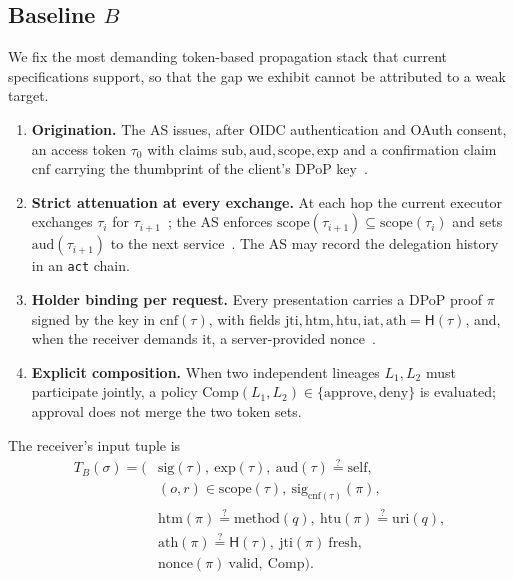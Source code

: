 \documentclass[conference]{IEEEtran}
\newcommand{\scope}{\mathrm{scope}}
\newcommand{\aud}{\mathrm{aud}}
\newcommand{\Comp}{\mathrm{Comp}}
\newcommand{\Hsh}{\mathsf{H}}
\begin{document}
\subsection{Baseline $B$}
We fix the most demanding token-based propagation stack that current specifications support, so that the gap we exhibit cannot be attributed to a weak target.

\begin{enumerate}
\item[\textbf{B1}] \textbf{Origination.} The AS issues, after OIDC authentication and OAuth consent, an access token $\tau_0$ with claims $\mathrm{sub},\aud,\scope,\mathrm{exp}$ and a confirmation claim $\mathrm{cnf}$ carrying the thumbprint of the client's DPoP key~\cite{rfc9449,rfc7519}.
\item[\textbf{B2}] \textbf{Strict attenuation at every exchange.} At each hop the current executor exchanges $\tau_i$ for $\tau_{i+1}$~\cite{rfc8693}; the AS enforces $\scope(\tau_{i+1})\subseteq\scope(\tau_i)$ and sets $\aud(\tau_{i+1})$ to the next service~\cite{rfc8707}. The AS may record the delegation history in an \texttt{act} chain.
\item[\textbf{B3}] \textbf{Holder binding per request.} Every presentation carries a DPoP proof $\pi$ signed by the key in $\mathrm{cnf}(\tau)$, with fields $\mathrm{jti},\mathrm{htm},\mathrm{htu},\mathrm{iat},\mathrm{ath}=\Hsh(\tau)$, and, when the receiver demands it, a server-provided $\mathrm{nonce}$~\cite{rfc9449}.
\item[\textbf{B4}] \textbf{Explicit composition.} When two independent lineages $L_1,L_2$ must participate jointly, a policy $\Comp(L_1,L_2)\in\{\mathrm{approve},\mathrm{deny}\}$ is evaluated; approval does not merge the two token sets.
\end{enumerate}

The receiver's input tuple is
\begin{align*}
T_B(\sigma) = \big(&\mathrm{sig}(\tau),\ \mathrm{exp}(\tau),\ \aud(\tau)\overset{?}{=}\mathrm{self},\\
&(o,r)\in\scope(\tau),\ \mathrm{sig}_{\mathrm{cnf}(\tau)}(\pi),\\
&\mathrm{htm}(\pi)\overset{?}{=}\mathrm{method}(q),\ \mathrm{htu}(\pi)\overset{?}{=}\mathrm{uri}(q),\\
&\mathrm{ath}(\pi)\overset{?}{=}\Hsh(\tau),\ \mathrm{jti}(\pi)\ \mathrm{fresh},\\
&\mathrm{nonce}(\pi)\ \mathrm{valid},\ \Comp\big).
\end{align*}
\end{document}
